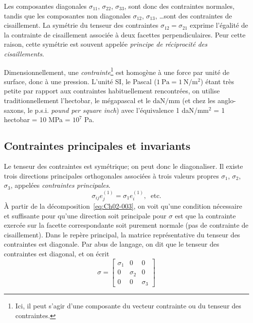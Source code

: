 Les composantes diagonales $\sigma_{11}$, $\sigma_{22}$, $\sigma_{33}$, sont donc des contraintes normales, tandis que les composantes non diagonales $\sigma_{12}$, $\sigma_{13}$, \dots sont des contraintes de cisaillement.
La symétrie du tenseur des contraintes $\sigma_{12} = \sigma_{21}$ exprime l'égalité de la contrainte de cisaillement associée à deux facettes perpendiculaires.
Peur cette raison, cette symétrie est souvent appelée \emph{principe de réciprocité des cisaillements}.

Dimensionnellement, une \emph{contrainte}\footnote{Ici, il peut s'agir d'une composante du vecteur contrainte ou du tenseur des contraintes.} est homogène à une force par unité de surface, donc à une pression.
L'unité SI, le Pascal ($1~\text{Pa} = 1~\text{N}/\text{m}^2$) étant très petite par rapport aux contraintes habituellement rencontrées, on utilise traditionnellement l'hectobar, le mégapascal et le $\text{daN}/\text{mm}$ (et chez les anglo-saxons, le p.s.i. \textit{pound per square inch})
avec l'équivalence 1 daN/mm$^2$ = 1 hectobar = 10 MPa = $10^7$ Pa.

\subsection{Contraintes principales et invariants} \label{ssec:Ch02-1.2}
Le tenseur des contraintes est symétrique; on peut donc le diagonaliser.
Il existe trois directions principales orthogonales associées à trois valeurs propres $\sigma_1$, $\sigma_2$, $\sigma_3$,  appelées \emph{contraintes principales}.
\begin{equation}
    \sigma_{ij} e_j^{(1)} = \sigma_1 e_i^{(1)},\ \text{ etc.}
    \label{eq:Ch02-008}
\end{equation}
À partir de la décomposition~\eqref{eq:Ch02-003}, on voit qu'une condition nécessaire et suffisante pour qu'une direction soit principale pour $\mathbb{\sigma}$ est que la contrainte exercée sur la facette correspondante soit purement normale (pas de contrainte de cisaillement).
Dans le repère principal, la matrice représentative du tenseur des contraintes est diagonale.
Par abus de langage, on dit que le tenseur des contraintes est diagonal, et on écrit
\begin{equation}
    \mathbb{\sigma} = 
    \begin{bmatrix}
        \sigma_1 & 0 & 0 \\
        0 & \sigma_2 & 0 \\
        0 & 0 & \sigma_3
    \end{bmatrix}
    \label{eq:Ch02-009}
\end{equation}

